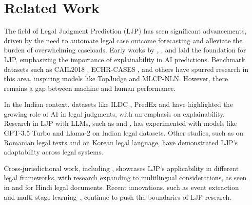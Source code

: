 \section{Related Work}
The field of Legal Judgment Prediction (LJP) has seen significant advancements, driven by the need to automate legal case outcome forecasting and alleviate the burden of overwhelming caseloads. Early works by \cite{aletras2016predicting}, \cite{chalkidis2019neural}, and \cite{feng2021recommending} laid the foundation for LJP, emphasizing the importance of explainability in AI predictions. Benchmark datasets such as CAIL2018 \cite{xiao2018cail2018}, ECHR-CASES \cite{chalkidis2019neural}, and others have spurred research in this area, inspiring models like TopJudge and MLCP-NLN. However, there remains a gap between machine and human performance.

In the Indian context, datasets like ILDC \cite{malik-etal-2021-ildc}, PredEx \cite{nigam-etal-2024-legal} and \cite{nigam2022nigam, malik-etal-2022-semantic, nigam2023legal} have highlighted the growing role of AI in legal judgments, with an emphasis on explainability. Research in LJP with LLMs, such as \cite{vats2023llms} and \cite{nigam-etal-2024-legal}, has experimented with models like GPT-3.5 Turbo and Llama-2 on Indian legal datasets. Other studies, such as \cite{masala2021jurbert} on Romanian legal texts and \cite{hwang2022multi} on Korean legal language, have demonstrated LJP's adaptability across legal systems.

Cross-jurisdictional work, including \cite{zhao-etal-2018-learning}, showcases LJP's applicability in different legal frameworks, with research expanding to multilingual considerations, as seen in \cite{niklaus2021swiss} and \cite{kapoor-etal-2022-hldc} for Hindi legal documents. Recent innovations, such as event extraction and multi-stage learning~\cite{feng-etal-2022-legal}, continue to push the boundaries of LJP research.








